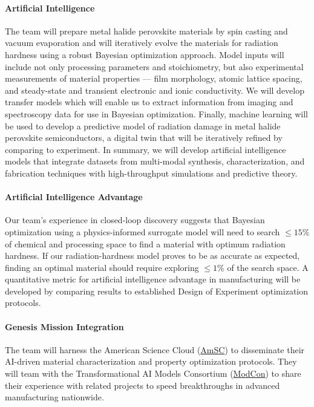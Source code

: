 \documentclass[../main.tex]{subfiles}
\begin{document}
\paragraph{Artificial Intelligence}
The team will prepare  metal halide perovskite materials by spin casting and vacuum evaporation and will iteratively evolve the materials for radiation hardness using a robust Bayesian optimization approach.
Model inputs will include not only processing parameters and stoichiometry, but also experimental measurements of material properties --- film morphology, atomic lattice spacing, and steady-state and transient electronic and ionic conductivity.
We will develop transfer models which will enable us to extract information from imaging and spectroscopy data for use in Bayesian optimization.
Finally, machine learning will be used to develop a predictive model of radiation damage in metal halide perovskite semiconductors, a digital twin that will be iteratively refined by comparing to experiment.
In summary, we will develop artificial intelligence models that integrate datasets from multi-modal synthesis, characterization, and fabrication techniques with high-throughput simulations and
predictive theory.

\paragraph{Artificial Intelligence Advantage}
Our team's experience in closed-loop discovery suggests that Bayesian optimization using a physics-informed surrogate model will need to search $\leq \! 15$\% of chemical and processing space to find a material with optimum radiation hardness.
If our radiation-hardness model proves to be as accurate as expected, finding an optimal material should require exploring $\leq \! 1$\% of the search space.
A quantitative metric for artificial intelligence advantage in manufacturing will be developed by comparing results to established Design of Experiment optimization protocols.

\paragraph{Genesis Mission Integration}
The team will harness the American Science Cloud
(\href{https://amsc.energy.gov/}{AmSC}) 
to disseminate their AI-driven material characterization and property optimization protocols.
They will team with the Transformational AI Models Consortium 
(\href{https://www.anl.gov/genesis-mission}{ModCon})
to share their experience with related projects to speed breakthroughs in advanced manufacturing nationwide.
\end{document}
